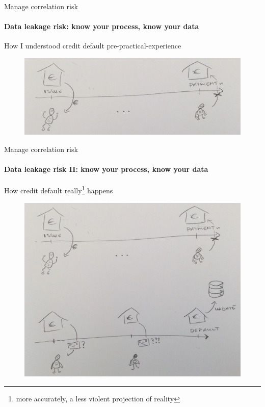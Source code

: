 \begin{frame}{Manage correlation risk}
    \framesubtitle{Data leakage risk: know your process, know your data}
    How I understood credit default pre-practical-experience
    \newline
    \begin{figure}[ht]
        \includegraphics[height=0.5\textheight]{graphics/default-process-start}
    \end{figure}

\end{frame}

\begin{frame}{Manage correlation risk}
    \framesubtitle{Data leakage risk II: know your process, know your data}
    How credit default really\footnote{
        more accurately, a less violent projection of reality
    } happens
    \newline
    \begin{figure}[ht]
        \includegraphics[height=0.6\textheight]{graphics/default-process-whole}
    \end{figure}

\end{frame}

